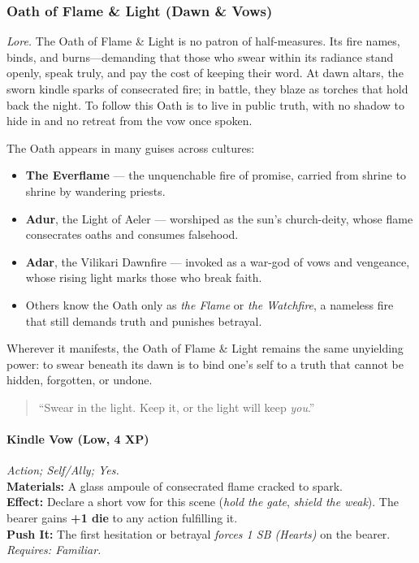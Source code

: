 
\subsubsection{Oath of Flame \& Light (Dawn \& Vows)}
\textit{Lore.} The Oath of Flame \& Light is no patron of half-measures. Its fire names, binds, and burns—demanding that those who swear within its radiance stand openly, speak truly, and pay the cost of keeping their word. At dawn altars, the sworn kindle sparks of consecrated fire; in battle, they blaze as torches that hold back the night. To follow this Oath is to live in public truth, with no shadow to hide in and no retreat from the vow once spoken.

The Oath appears in many guises across cultures:  
\begin{itemize}
  \item \textbf{The Everflame} — the unquenchable fire of promise, carried from shrine to shrine by wandering priests.  
  \item \textbf{Adur}, the Light of Aeler — worshiped as the sun’s church-deity, whose flame consecrates oaths and consumes falsehood.  
  \item \textbf{Adar}, the Vilikari Dawnfire — invoked as a war-god of vows and vengeance, whose rising light marks those who break faith.  
  \item Others know the Oath only as \textit{the Flame} or \textit{the Watchfire}, a nameless fire that still demands truth and punishes betrayal.  
\end{itemize}

Wherever it manifests, the Oath of Flame \& Light remains the same unyielding power: to swear beneath its dawn is to bind one’s self to a truth that cannot be hidden, forgotten, or undone.

\begin{quote}
“Swear in the light. Keep it, or the light will keep \emph{you}.” 
\end{quote}

\paragraph*{Kindle Vow (Low, 4 XP)} \emph{Action; Self/Ally; Yes.}\\
\textbf{Materials:} A glass ampoule of consecrated flame cracked to spark.\\
\textbf{Effect:} Declare a short vow for this scene (\emph{hold the gate}, \emph{shield the weak}). The bearer gains \textbf{+1 die} to any action fulfilling it.\\
\textbf{Push It:} The first hesitation or betrayal \emph{forces 1 SB (Hearts)} on the bearer.\\
\emph{Requires: Familiar.}

